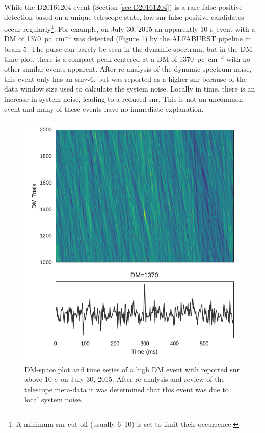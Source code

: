 \documentclass[a4paper,fleqn,usenatbib]{mnras}
\begin{document}
While the D20161204 event (Section \ref{sec:D20161204}) is a rare false-positive
detection based on a unique telescope state, low-\gls{snr} false-positive
candidates occur regularly\footnote{A minimum \gls{snr} cut-off (usually 6--10)
is set to limit their occurrence.}. For example, on July 30, 2015 an apparently
10-$\sigma$ event with a DM of 1370~pc~cm$^{-3}$ was detected (Figure
\ref{fig:D20150730}) by the ALFABURST pipeline in beam 5. The pulse can barely
be seen in the dynamic spectrum, but in the DM-time plot, there is a compact
peak centered at a DM of 1370~pc~cm$^{-3}$ with no other similar events
apparent.  After re-analysis of the dynamic spectrum noise, this event only has
an \gls{snr}$\sim$6, but was reported as a higher \gls{snr} because of the data
window size used to calculate the system noise.  Locally in time, there is an
increase in system noise, leading to a reduced \gls{snr}.  This is not an
uncommon event and many of these events have no immediate explanation.

\begin{figure}
    \includegraphics[width=1.0\linewidth]{figures/D20150730_buf23_Beam6_dmtrial.pdf}
    \caption{DM-space plot and time series of a high DM event with reported
    \gls{snr} above 10-$\sigma$ on July 30, 2015. After re-analysis and review
    of the telescope meta-data it was determined that this event was due to
    local system noise.
    }
    \label{fig:D20150730}
\end{figure}
\end{document}

